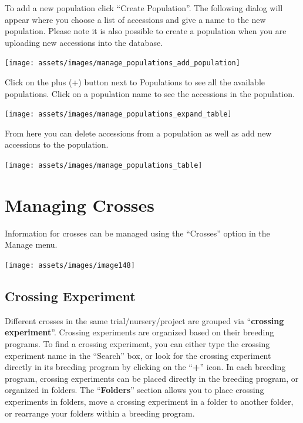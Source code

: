 \documentclass[
  12pt,
]{book}
\begin{document}
To add a new population click ``Create Population''. The following dialog will appear where you choose a list of accessions and give a name to the new population. Please note it is also possible to create a population when you are uploading new accessions into the database.

\begin{center}\texttt{[image: assets/images/manage\_populations\_add\_population]} \end{center}

Click on the plus (+) button next to Populations to see all the available populations. Click on a population name to see the accessions in the population.

\begin{center}\texttt{[image: assets/images/manage\_populations\_expand\_table]} \end{center}

From here you can delete accessions from a population as well as add new accessions to the population.

\begin{center}\texttt{[image: assets/images/manage\_populations\_table]} \end{center}

\hypertarget{managing-crosses}{%
\chapter{Managing Crosses}\label{managing-crosses}}

Information for crosses can be managed using the ``Crosses'' option in the Manage menu.

\begin{center}\texttt{[image: assets/images/image148]} \end{center}

\hypertarget{crossing-experiment}{%
\section{Crossing Experiment}\label{crossing-experiment}}

Different crosses in the same trial/nursery/project are grouped via ``\textbf{crossing experiment}''. Crossing experiments are organized based on their breeding programs. To find a crossing experiment, you can either type the crossing experiment name in the ``Search'' box, or look for the crossing experiment directly in its breeding program by clicking on the ``\textbf{+}'' icon. In each breeding program, crossing experiments can be placed directly in the breeding program, or organized in folders. The ``\textbf{Folders}'' section allows you to place crossing experiments in folders, move a crossing experiment in a folder to another folder, or rearrange your folders within a breeding program.
\end{document}

